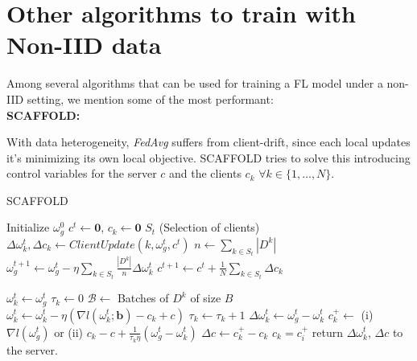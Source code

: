 \section{Other algorithms to train with Non-IID data}

Among several algorithms that can be used for training a FL model under a non-IID setting, we mention some of the most performant:\\

\textbf{SCAFFOLD:}

With data heterogeneity, \textit{FedAvg} suffers from client-drift, since each local updates it's minimizing its own local objective. SCAFFOLD tries to solve this introducing control variables for the server $c$ and the clients $c_k$ $\forall k \in \{1,\dots, N\}$.

\begin{algorithm}[H]
  \label{alg:SCAFFOLD}
  \caption{SCAFFOLD}
  \begin{algorithmic}[1]
    \Statex
    \State Initialize $\omega_g^0$
    \State $c^t \gets \mathbf{0}$, $c_k \gets \mathbf{0}$
      \State $S_t$  (Selection of clients)
        \State $\Delta \omega_k^{t}, \Delta c_k \gets ClientUpdate(k, \omega_g^t, c^t)$
      \EndFor
      \State $n \gets \sum_{k \in S_t} |D^k|$
      \State $\omega_g^{t+1} \gets \omega_g^t - \eta \sum_{k \in S_t} \frac{|D^k|}{n} \Delta \omega_k^t$
      \State $c^{t+1} \gets c^t + \frac{1}{N} \sum_{k \in S_t} \Delta c_k$
    \EndFor
    \EndProcedure

    \State $\omega_k^t \gets \omega_g^t$
    \State $\tau_k \gets 0$
    \State $\mathcal{B} \gets$ Batches of $D^k$ of size $B$
        \State $\omega_k^t \gets \omega_k^t - \eta (\nabla l(\omega_k^t; \mathbf{b}) - c_k + c)$
        \State $\tau_k \gets \tau_k + 1$
      \EndFor
    \EndFor
    \State $\Delta \omega_k^t \gets \omega_g^t - \omega_k^t$
    \State $c_k^+ \gets $ (i) $\nabla l(\omega_g^t)$ or (ii) $c_k - c + \frac{1}{\tau_k \eta} (\omega_g^t - \omega_k^t)$
    \State $\Delta c \gets c_k^+ - c_k$
    \State $c_k = c_i^+$
    \State return $\Delta \omega_k^t$, $\Delta c$  to the server.
    \EndProcedure
  \end{algorithmic}
\end{algorithm}


